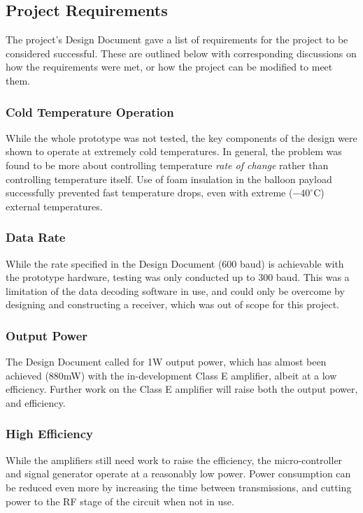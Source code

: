 \documentclass[a4paper,12pt]{article}
\begin{document}
\subsection{Project Requirements}
The project's Design Document gave a list of requirements for the project to be considered successful. These are outlined below with corresponding discussions on how the requirements were met, or how the project can be modified to meet them.

\subsubsection{Cold Temperature Operation}
While the whole prototype was not tested, the key components of the design were shown to operate at extremely cold temperatures. In general, the problem was found to be more about controlling temperature \textit{rate of change} rather than controlling temperature itself. Use of foam insulation in the balloon payload successfully prevented fast temperature drops, even with extreme ($-40^\circ$C) external temperatures.

\subsubsection{Data Rate}
While the rate specified in the Design Document (600 baud) is achievable with the prototype hardware, testing was only conducted up to 300 baud. This was a limitation of the data decoding software in use, and could only be overcome by designing and constructing a receiver, which was out of scope for this project.

\subsubsection{Output Power}
The Design Document called for 1W output power, which has almost been achieved (880mW) with the in-development Class E amplifier, albeit at a low efficiency. Further work on the Class E amplifier will raise both the output power, and efficiency.

\subsubsection{High Efficiency}
While the amplifiers still need work to raise the efficiency, the micro-controller and signal generator operate at a reasonably low power. Power consumption can be reduced even more by increasing the time between transmissions, and cutting power to the RF stage of the circuit when not in use.
\end{document}
